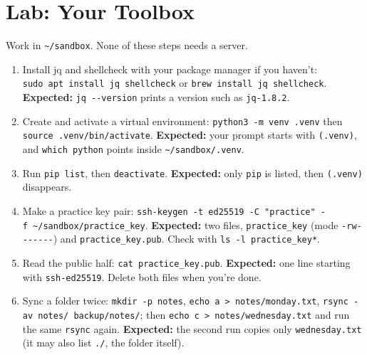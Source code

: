 \section{Lab: Your Toolbox}\label{07-installing-software-and-working-remotely:lab-your-toolbox}

Work in \texttt{\textasciitilde{}/sandbox}. None of these steps needs a server.

\begin{enumerate}
\def\labelenumi{\arabic{enumi}.}
\tightlist
\item
  Install jq and shellcheck with your package manager if you haven't: \texttt{sudo\ apt\ install\ jq\ shellcheck} or \texttt{brew\ install\ jq\ shellcheck}. \textbf{Expected:} \texttt{jq\ -\/-version} prints a version such as \texttt{jq-1.8.2}.
\item
  Create and activate a virtual environment: \texttt{python3\ -m\ venv\ .venv} then \texttt{source\ .}\allowbreak{}\texttt{venv/}\allowbreak{}\texttt{bin/}\allowbreak{}\texttt{activate}. \textbf{Expected:} your prompt starts with \texttt{(.venv)}, and \texttt{which\ python} points inside \texttt{\textasciitilde{}/sandbox/.venv}.
\item
  Run \texttt{pip\ list}, then \texttt{deactivate}. \textbf{Expected:} only \texttt{pip} is listed, then \texttt{(.venv)} disappears.
\item
  Make a practice key pair: \texttt{ssh-}\allowbreak{}\texttt{keygen\ -}\allowbreak{}\texttt{t\ ed25519\ -}\allowbreak{}\texttt{C\ "practice"\ -}\allowbreak{}\texttt{f\ \textasciitilde{}/}\allowbreak{}\texttt{sandbox/}\allowbreak{}\texttt{practice\_}\allowbreak{}\texttt{key}. \textbf{Expected:} two files, \texttt{practice\_key} (mode \texttt{-rw-\/-\/-\/-\/-\/-\/-}) and \texttt{practice\_key.pub}. Check with \texttt{ls\ -l\ practice\_key*}.
\item
  Read the public half: \texttt{cat\ practice\_key.pub}. \textbf{Expected:} one line starting with \texttt{ssh-ed25519}. Delete both files when you're done.
\item
  Sync a folder twice: \texttt{mkdir\ -p\ notes}, \texttt{echo\ a\ \textgreater{}\ notes/}\allowbreak{}\texttt{monday.}\allowbreak{}\texttt{txt}, \texttt{rsync\ -}\allowbreak{}\texttt{av\ notes/}\allowbreak{}\texttt{\ backup/}\allowbreak{}\texttt{notes/}; then \texttt{echo\ c\ \textgreater{}\ notes/}\allowbreak{}\texttt{wednesday.}\allowbreak{}\texttt{txt} and run the same \texttt{rsync} again. \textbf{Expected:} the second run copies only \texttt{wednesday.txt} (it may also list \texttt{./}, the folder itself).
\end{enumerate}


